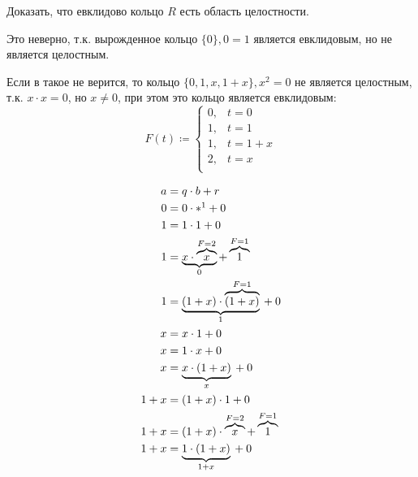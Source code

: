 

\cfoot{}



\begin{exercise}
    Доказать, что евклидово кольцо \(R\) есть область целостности.
\end{exercise}
\begin{solution}
    Это неверно, т.к. вырожденное кольцо \(\{0\}, 0 = 1\) является евклидовым, но не является целостным.

    Если в такое не верится, то кольцо \(\{0, 1, x, 1 + x\}, x^2 = 0\) не является целостным, т.к. \(x \cdot x = 0\), но \(x \neq 0\), при этом это кольцо является евклидовым:
    \[F(t) \coloneqq \begin{cases}
            0, & t = 0     \\
            1, & t = 1     \\
            1, & t = 1 + x \\
            2, & t = x     \\
        \end{cases}\]

    \begin{align*}
        a     & = q \cdot b + r                                                        \\
        0     & = 0 \cdot *\footnotemark + 0                                           \\
        1     & = 1 \cdot 1 + 0                                                        \\
        1     & = \underbrace{x \cdot \overbrace{x}^{F = 2}}_0 + \overbrace{1}^{F = 1} \\
        1     & = \underbrace{(1 + x) \cdot \overbrace{(1 + x)}^{F = 1}}_1 {}+ 0       \\
        x     & = x \cdot 1 + 0                                                        \\
        x     & = 1 \cdot x + 0                                                        \\
        x     & = \underbrace{x \cdot (1 + x)}_x {}+ 0                                 \\
        1 + x & = (1 + x) \cdot 1 + 0                                                  \\
        1 + x & = (1 + x) \cdot \overbrace{x}^{F = 2} + \overbrace{1}^{F = 1}          \\
        1 + x & = \underbrace{1 \cdot (1 + x)}_{1 + x} {}+ 0                           \\
    \end{align*}
\end{solution}

